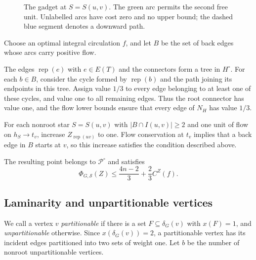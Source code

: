 \documentclass[11pt]{amsart}
\newcommand{\rep}[1]{\operatorname{rep}(#1)}
\newcommand{\1}{\mathbbm{1}}
\begin{document}
\begin{figure}[htbp]
\caption{The gadget at $S=S(u,v)$. The green arc permits the
second free unit. Unlabelled arcs have cost zero and no upper
bound; the dashed blue segment denotes a downward path.}
\label{fig:Z-circulation}
\end{figure}

Choose an optimal integral circulation $f$, and let $B$ be
the set of back edges whose arcs carry positive flow.

The edges $\rep{e}$ with $e\in E(T)$ and the connectors
form a tree in $H^\circ$. For each $b\in B$, consider
the cycle formed by $\rep{b}$ and the path joining its
endpoints in this tree. Assign value $1/3$ to every edge
belonging to at least one of these cycles, and value one
to all remaining edges. Thus the root connector has value
one, and the flow lower bounds ensure that every edge
of $N_H$ has value $1/3$.

For each nonroot star $S=S(u,v)$ with
$|B\cap I(u,v)|\ge2$ and one unit of flow on $h_S\to t_v$,
increase $Z_{\rep{uv}}$ to one. Flow conservation at $t_v$
implies that a back edge in $B$ starts at $v$, so this
increase satisfies the condition described above.

The resulting point belongs to ${\mathcal P^\circ}$ and satisfies
\begin{equation}\label{eq:Z-total-cost}
 \Phi_{G,\mathcal S}(Z)
 \le \frac{4n-2}{3}+\frac23 C^Z(f).
\end{equation}

\FloatBarrier
\subsection{Laminarity and unpartitionable vertices}
\label{subsec:further-laminarity}

We call a vertex $v$ \emph{partitionable} if there is a set
$F\subseteq\delta_G(v)$ with $x(F)=1$, and \emph{unpartitionable}
otherwise. Since $x(\delta_G(v))=2$, a partitionable vertex has
its incident edges partitioned into two sets of weight one.
Let $b$ be the number of nonroot unpartitionable vertices.
\end{document}
